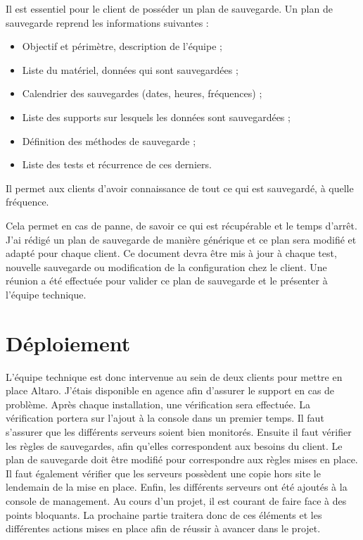 \documentclass[pfe]{tnreport} %
\begin{document}
Il est essentiel pour le client de posséder un plan de sauvegarde. \newline
Un plan de sauvegarde reprend les informations suivantes : \newline
\begin{itemize}
 \item Objectif et périmètre, description de l'équipe ;
 \item Liste du matériel, données qui sont sauvegardées ;
 \item Calendrier des sauvegardes (dates, heures, fréquences) ;
 \item Liste des supports sur lesquels les données sont sauvegardées ;
 \item Définition des méthodes de sauvegarde ;
 \item Liste des tests et récurrence de ces derniers. \newline
\end{itemize}

Il permet aux clients d'avoir connaissance de tout ce qui est sauvegardé, à quelle fréquence. \newline

Cela permet en cas de panne, de savoir ce qui est récupérable et le temps d'arrêt. \newline
J'ai rédigé un plan de sauvegarde de manière générique et ce plan sera modifié et adapté pour chaque client. \newline
Ce document devra être mis à jour à chaque test, nouvelle sauvegarde ou modification de la configuration chez le client. \newline
Une réunion a été effectuée pour valider ce plan de sauvegarde et le présenter à l'équipe technique.

\section{Déploiement}

L'équipe technique est donc intervenue au sein de deux clients pour mettre en place Altaro. \newline
J'étais disponible en agence afin d'assurer le support en cas de problème. \newline
Après chaque installation, une vérification sera effectuée. \newline
La vérification portera sur l'ajout à la console dans un premier temps. Il faut s'assurer que les différents serveurs soient bien monitorés. Ensuite il faut vérifier les règles de sauvegardes, afin qu'elles correspondent aux besoins du client. \newline
Le plan de sauvegarde doit être modifié pour correspondre aux règles mises en place. \newline
Il faut également vérifier que les serveurs possèdent une copie hors site le lendemain de la mise en place. \newline
Enfin, les différents serveurs ont été ajoutés à la console de management. \newline
Au cours d'un projet, il est courant de faire face à des points bloquants. La prochaine partie traitera donc de ces éléments et les différentes actions mises en place afin de réussir à avancer dans le projet.
\end{document}

